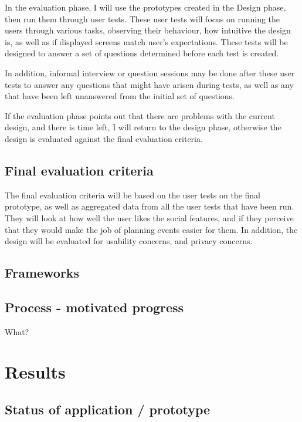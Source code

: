 \documentclass[]{report}
\begin{document}
In the evaluation phase, I will use the prototypes created in the Design phase,
then run them through user tests. These user tests will focus on running the
users through various tasks, observing their behaviour, how intuitive the
design is, as well as if displayed screens match user's expectations. These
tests will be designed to answer a set of questions determined before each test
is created.

In addition, informal interview or question sessions may be done after these
user tests to answer any questions that might have arisen during tests, as well
as any that have been left unanswered from the initial set of questions.

If the evaluation phase points out that there are problems with the current
design, and there is time left, I will return to the design phase, otherwise the
design is evaluated against the final evaluation criteria.

\section{Final evaluation criteria}

The final evaluation criteria will be based on the user tests on the final
prototype, as well as aggregated data from all the user tests that have been
run. They will look at how well the user likes the social features, and if they
perceive that they would make the job of planning events easier for them. In
addition, the design will be evaluated for usability concerns, and privacy
concerns.

\section{Frameworks}

\section{Process - motivated progress}

What?

\chapter{Results}

\section{Status of application / prototype}
\end{document}
